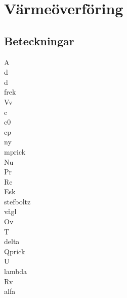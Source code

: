 \chapter{Värmeöverföring}
\section*{Beteckningar}
\acrfull{A}\\
\acrfull{d}\\
\acrfull{d}\\
\acrfull{frek}\\
\acrfull{Vv}\\
\acrfull{c}\\
\acrfull{c0}\\
\acrfull{cp}\\
\acrfull{ny}\\
\acrfull{mprick}\\
\acrfull{Nu}\\
\acrfull{Pr}\\
\acrfull{Re}\\
\acrfull{Esk}\\
\acrfull{stefboltz}\\
\acrfull{vågl}\\
\acrfull{Ov}\\
\acrfull{T}\\
\acrfull{delta}\\
\acrfull{Qprick}\\
\acrfull{U}\\
\acrfull{lambda}\\
\acrfull{Rv}\\
\acrfull{alfa}

